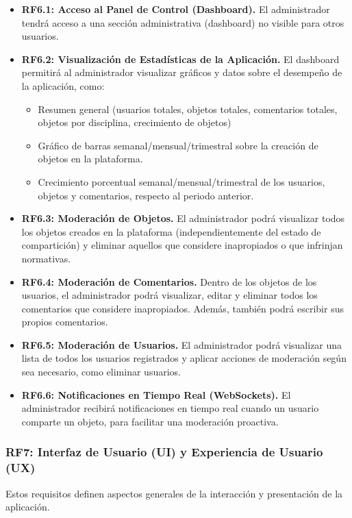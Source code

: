 \begin{itemize}
    \item \textbf{RF6.1: Acceso al Panel de Control (Dashboard).} El administrador tendrá acceso a una sección administrativa (dashboard) no visible para otros usuarios.
    \item \textbf{RF6.2: Visualización de Estadísticas de la Aplicación.} El dashboard permitirá al administrador visualizar gráficos y datos sobre el desempeño de la aplicación, como:
    \begin{itemize}
        \item Resumen general (usuarios totales, objetos totales, comentarios totales, objetos por disciplina, crecimiento de objetos)
        \item Gráfico de barras semanal/mensual/trimestral sobre la creación de objetos en la plataforma.
        \item Crecimiento porcentual semanal/mensual/trimestral de los usuarios, objetos y comentarios, respecto al periodo anterior.
    \end{itemize}
    \item \textbf{RF6.3: Moderación de Objetos.} El administrador podrá visualizar todos los objetos creados en la plataforma (independientemente del estado de compartición) y eliminar aquellos que considere inapropiados o que infrinjan normativas.
    \item \textbf{RF6.4: Moderación de Comentarios.} Dentro de los objetos de los usuarios, el administrador podrá visualizar, editar y eliminar todos los comentarios que considere inapropiados. Además, también podrá escribir sus propios comentarios.
    \item \textbf{RF6.5: Moderación de Usuarios.} El administrador podrá visualizar una lista de todos los usuarios registrados y aplicar acciones de moderación según sea necesario, como eliminar usuarios.
    \item \textbf{RF6.6: Notificaciones en Tiempo Real (WebSockets).} El administrador recibirá notificaciones en tiempo real cuando un usuario comparte un objeto, para facilitar una moderación proactiva.
\end{itemize}

\subsubsection{RF7: Interfaz de Usuario (UI) y Experiencia de Usuario (UX)}
\label{rf:uiUx}
Estos requisitos definen aspectos generales de la interacción y presentación de la aplicación.

